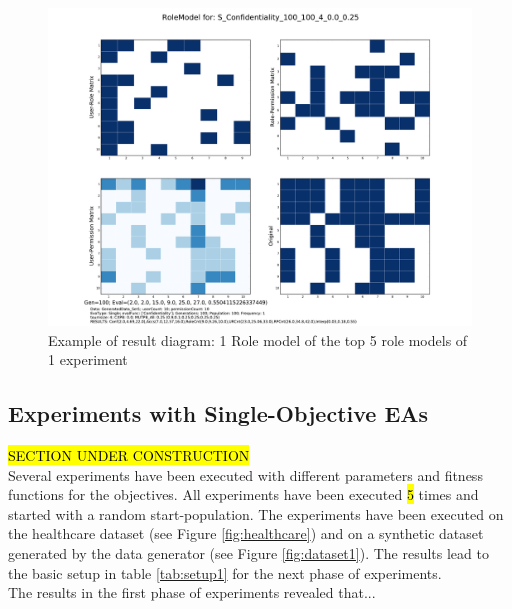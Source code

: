     \begin{figure}[H]
        \centering
        \includegraphics[scale=0.3]{./Figures/testresult4}
        \caption{Example of result diagram: 1 Role model of the top 5 role models of 1 experiment}
        \label{fig:testresult4}
    \end{figure}
\fi

\subsection{Experiments with Single-Objective EAs}
\hl{SECTION UNDER CONSTRUCTION}\\
Several experiments have been executed with different parameters and fitness functions for the objectives. All experiments have been executed \hl{5} times and started with a random start-population. The experiments have been executed on the healthcare dataset (see Figure \ref{fig:healthcare}) and on a synthetic dataset generated by the data generator (see Figure \ref{fig:dataset1}). The results lead to the basic setup in table \ref{tab:setup1} for the next phase of experiments.\\
The results in the first phase of experiments revealed that...

